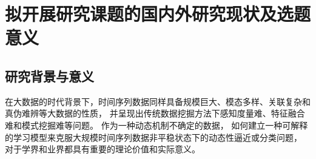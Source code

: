 \section{拟开展研究课题的国内外研究现状及选题意义}\label{sec:2.2}
\subsection{研究背景与意义}\label{subsection:2.2.1}


在大数据的时代背景下，时间序列数据同样具备规模巨大、模态多样、关联复杂和真伪难辨等大数据的性质，
并呈现出传统数据挖掘方法下感知度量难、特征融合难和模式挖掘难等问题。
作为一种动态机制不确定的数据，
如何建立一种可解释的学习模型来克服大规模时间序列数据非平稳状态下的动态性逼近或分类问题，
对于学界和业界都具有重要的理论价值和实际意义。